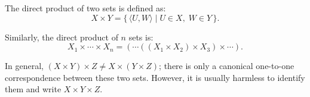 The direct product of two sets is defined as:
$$X \times Y = \{\, \langle U, W \rangle \mid U \in X,\; W \in Y \,\}.$$

Similarly, the direct product of $n$ sets is:
$$X_1 \times \cdots \times X_n = (\cdots ((X_1 \times X_2) \times X_3) \times \cdots).$$

In general, $(X \times Y) \times Z \neq X \times (Y \times Z)$; there is only a canonical one-to-one correspondence between these two sets. However, it is usually harmless to identify them and write $X \times Y \times Z$.

